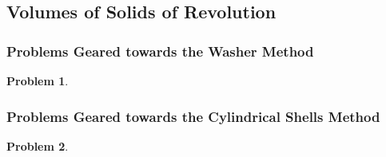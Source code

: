 \documentclass{article}
\newtheorem{problem}{Problem}
\begin{document}
\subsection{Volumes of Solids of Revolution}\label{secMPSvolumesSolidsRevolution}
\subsubsection{Problems Geared towards the Washer Method}\label{secMPSvolumesSolidsRevolutionWashers}
\begin{problem}

\end{problem}



\subsubsection{Problems Geared towards the Cylindrical Shells Method}\label{secMPSvolumesSolidsRevolutionShells}
\begin{problem}

\end{problem}
\end{document}
